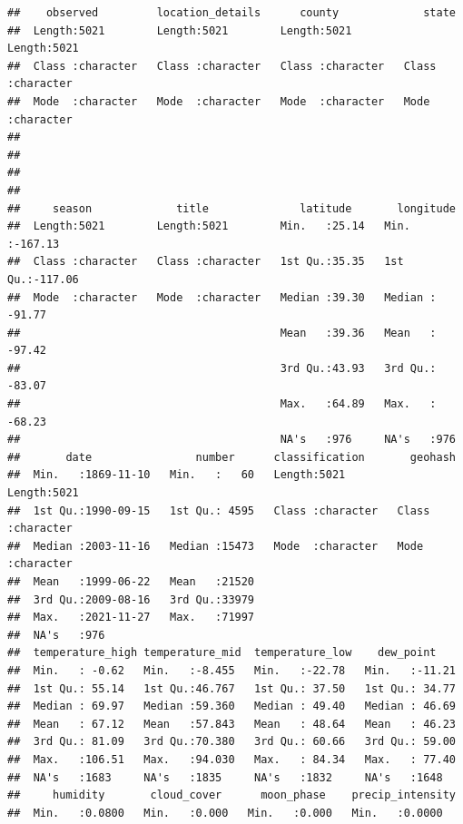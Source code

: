 \documentclass[
]{article}
\begin{document}
\begin{verbatim}
##    observed         location_details      county             state          
##  Length:5021        Length:5021        Length:5021        Length:5021       
##  Class :character   Class :character   Class :character   Class :character  
##  Mode  :character   Mode  :character   Mode  :character   Mode  :character  
##                                                                             
##                                                                             
##                                                                             
##                                                                             
##     season             title              latitude       longitude      
##  Length:5021        Length:5021        Min.   :25.14   Min.   :-167.13  
##  Class :character   Class :character   1st Qu.:35.35   1st Qu.:-117.06  
##  Mode  :character   Mode  :character   Median :39.30   Median : -91.77  
##                                        Mean   :39.36   Mean   : -97.42  
##                                        3rd Qu.:43.93   3rd Qu.: -83.07  
##                                        Max.   :64.89   Max.   : -68.23  
##                                        NA's   :976     NA's   :976      
##       date                number      classification       geohash         
##  Min.   :1869-11-10   Min.   :   60   Length:5021        Length:5021       
##  1st Qu.:1990-09-15   1st Qu.: 4595   Class :character   Class :character  
##  Median :2003-11-16   Median :15473   Mode  :character   Mode  :character  
##  Mean   :1999-06-22   Mean   :21520                                        
##  3rd Qu.:2009-08-16   3rd Qu.:33979                                        
##  Max.   :2021-11-27   Max.   :71997                                        
##  NA's   :976                                                               
##  temperature_high temperature_mid  temperature_low    dew_point     
##  Min.   : -0.62   Min.   :-8.455   Min.   :-22.78   Min.   :-11.21  
##  1st Qu.: 55.14   1st Qu.:46.767   1st Qu.: 37.50   1st Qu.: 34.77  
##  Median : 69.97   Median :59.360   Median : 49.40   Median : 46.69  
##  Mean   : 67.12   Mean   :57.843   Mean   : 48.64   Mean   : 46.23  
##  3rd Qu.: 81.09   3rd Qu.:70.380   3rd Qu.: 60.66   3rd Qu.: 59.00  
##  Max.   :106.51   Max.   :94.030   Max.   : 84.34   Max.   : 77.40  
##  NA's   :1683     NA's   :1835     NA's   :1832     NA's   :1648    
##     humidity       cloud_cover      moon_phase    precip_intensity
##  Min.   :0.0800   Min.   :0.000   Min.   :0.000   Min.   :0.0000  

\end{verbatim}
\end{document}
